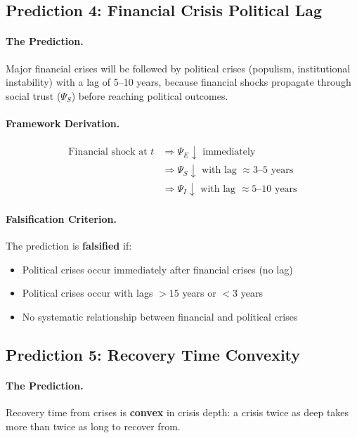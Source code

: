 \documentclass[12pt,a4paper]{article}
\begin{document}
\subsection{Prediction 4: Financial Crisis Political Lag}

\paragraph{The Prediction.}
Major financial crises will be followed by political crises (populism, institutional instability) with a lag of 5--10 years, because financial shocks propagate through social trust ($\Psi_S$) before reaching political outcomes.

\paragraph{Framework Derivation.}
\begin{align}
    \text{Financial shock at } t &\Rightarrow \Psi_E \downarrow \text{ immediately} \\
    &\Rightarrow \Psi_S \downarrow \text{ with lag } \approx 3\text{--}5 \text{ years} \\
    &\Rightarrow \Psi_I \downarrow \text{ with lag } \approx 5\text{--}10 \text{ years}
\end{align}

\paragraph{Falsification Criterion.}
The prediction is \textbf{falsified} if:
\begin{itemize}
    \item Political crises occur immediately after financial crises (no lag)
    \item Political crises occur with lags $> 15$ years or $< 3$ years
    \item No systematic relationship between financial and political crises
\end{itemize}

\subsection{Prediction 5: Recovery Time Convexity}

\paragraph{The Prediction.}
Recovery time from crises is \textbf{convex} in crisis depth: a crisis twice as deep takes more than twice as long to recover from.
\end{document}
